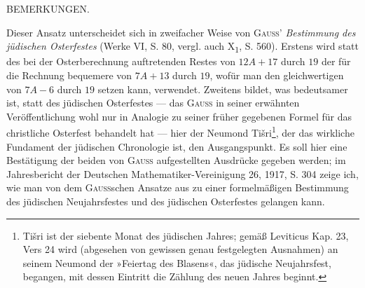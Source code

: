 \clearpage{}
\begin{center}\small BEMERKUNGEN.\end{center}
\begingroup\small
\noindent\hspace*{\parindent}Dieser Ansatz unterscheidet sich in zweifacher Weise von \textsc{Gauss}' \textit{Bestimmung des jüdischen Osterfestes} (Werke VI, S. 80, vergl. auch X\textsubscript{1}, S. 560). Erstens wird statt des bei der Osterberechnung auftretenden Restes von $12A+17$ durch $19$ der für die Rechnung bequemere von $7A+13$ durch $19$, wofür man den gleichwertigen von $7A-6$ durch $19$ setzen kann, verwendet. Zweitens bildet, was bedeutsamer ist, statt des jüdischen Osterfestes --- das \textsc{Gauss} in seiner erwähnten Veröffentlichung wohl nur in Analogie zu seiner früher gegebenen Formel für das christliche Osterfest behandelt hat --- hier der Neumond Tišri\begingroup\renewcommand{\thefootnote}{*)}\footnote{Tišri ist der siebente Monat des jüdischen Jahres; gemäß Leviticus Kap. 23, Vers 24 wird (abgesehen von gewissen genau festgelegten Ausnahmen) an seinem Neumond der »Feiertag des Blasens«, das jüdische Neujahrsfest, begangen, mit dessen Eintritt die Zählung des neuen Jahres beginnt.}\endgroup, der das wirkliche Fundament der jüdischen Chronologie ist, den Ausgangspunkt. Es soll hier eine Bestätigung der beiden von \textsc{Gauss} aufgestellten Ausdrücke gegeben werden; im Jahresbericht der Deutschen Mathematiker-Vereinigung 26, 1917, S. 304 zeige ich, wie man von dem \textsc{Gauss}schen Ansatze aus zu einer formelmäßigen Bestimmung des jüdischen Neujahrsfestes und des jüdischen Osterfestes gelangen kann.

